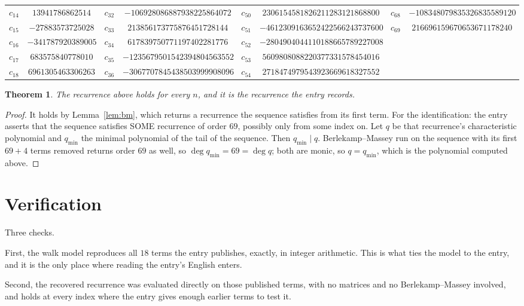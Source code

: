 \documentclass[11pt,a4paper]{article}
\theoremstyle{plain}
\newtheorem{theorem}{Theorem}
\theoremstyle{definition}
\begin{document}
\begin{center}
\begin{tabular}{cccccccc}
$c_{14}$ & $13941786862514$ & $c_{32}$ & $-106928086887938225864072$ & $c_{50}$ & $2306154581826211283121868800$ & $c_{68}$ & $-108348079835326835589120$ \\
$c_{15}$ & $-27883573725028$ & $c_{33}$ & $213856173775876451728144$ & $c_{51}$ & $-4612309163652422566243737600$ & $c_{69}$ & $216696159670653671178240$ \\
$c_{16}$ & $-341787920389005$ & $c_{34}$ & $617839750771197402281776$ & $c_{52}$ & $-2804904044110188665789227008$ &  &  \\
$c_{17}$ & $683575840778010$ & $c_{35}$ & $-1235679501542394804563552$ & $c_{53}$ & $5609808088220377331578454016$ &  &  \\
$c_{18}$ & $6961305463306263$ & $c_{36}$ & $-3067707845438503999908096$ & $c_{54}$ & $2718474979543923669618327552$ &  &  \\
\end{tabular}
\end{center}

\begin{theorem}
The recurrence above holds for every $n$, and it is the recurrence the entry records.
\end{theorem}

\begin{proof}
It holds by Lemma~\ref{lem:bm}, which returns a recurrence the sequence satisfies from its
first term. For the identification: the entry asserts that the sequence satisfies SOME
recurrence of order $69$, possibly only from some index on. Let $q$ be that recurrence's
characteristic polynomial and $q_{\min}$ the minimal polynomial of the tail of the sequence.
Then $q_{\min}\mid q$. Berlekamp--Massey run on the sequence with its first $69+4$ terms
removed returns order $69$ as well, so $\deg q_{\min}=69=\deg q$; both are monic, so
$q=q_{\min}$, which is the polynomial computed above.
\end{proof}

\section{Verification}

Three checks.

First, the walk model reproduces all $18$ terms the entry publishes, exactly, in integer
arithmetic. This is what ties the model to the entry, and it is the only place where reading
the entry's English enters.

Second, the recovered recurrence was evaluated directly on those published terms, with no
matrices and no Berlekamp--Massey involved, and holds at every index where the entry gives
enough earlier terms to test it.
\end{document}
